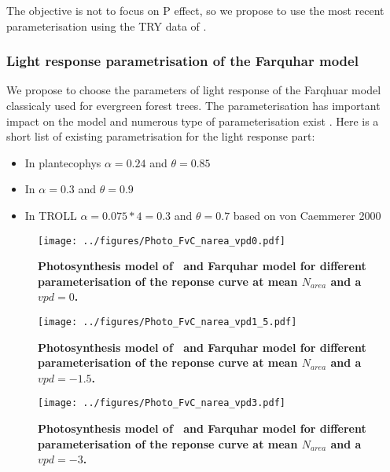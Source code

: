\documentclass[a4paper,11pt]{article}
\begin{document}
The objective is not to focus on P effect, so we propose to use the
most recent parameterisation using the TRY data of \citet{Sakschewski-2015}.


\subsubsection{Light response parametrisation of the Farquhar model}

We propose to choose the parameters of light response of the Farqhuar model
classicaly used for evergreen forest trees. The parameterisation has
important impact on the model and numerous type of parameterisation
exist \citep{Rogers-2017}. Here is a short list of existing parametrisation for the
light response part:
\begin{itemize}

\item In plantecophys \citep{Duursma-2015}  $\alpha = 0.24$ and $\theta = 0.85$

\item In \citet{Medlyn-2002} $\alpha = 0.3$ and $\theta = 0.9$

\item In TROLL \citet{Marechaux-2017} $\alpha = 0.075*4 = 0.3$ and $\theta = 0.7$ based on von Caemmerer 2000

\end{itemize}


\begin{figure}[ht]
\centering
\texttt{[image: ../figures/Photo\_FvC\_narea\_vpd0.pdf]}
\caption{\textbf{Photosynthesis model of \plant\ and Farquhar model
    for different parameterisation of the reponse curve at mean $N_{area}$ and a $vpd
    = 0$.}
\label{fig:photo0}}
\end{figure}

\begin{figure}[ht]
\centering
\texttt{[image: ../figures/Photo\_FvC\_narea\_vpd1\_5.pdf]}
\caption{\textbf{Photosynthesis model of \plant\ and Farquhar model for different parameterisation of the reponse curve at mean $N_{area}$ and a $vpd = -1.5$.}
\label{fig:photo15}}
\end{figure}

\begin{figure}[ht]
\centering
\texttt{[image: ../figures/Photo\_FvC\_narea\_vpd3.pdf]}
\caption{\textbf{Photosynthesis model of \plant\ and Farquhar model for different parameterisation of the reponse curve at mean $N_{area}$ and a $vpd = -3$.}
\label{fig:photo3}}
\end{figure}
\end{document}
